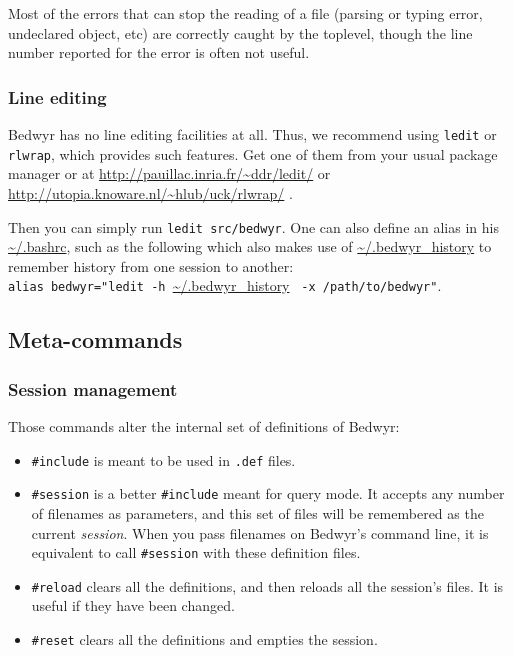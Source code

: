 \documentclass{article}
\begin{document}
Most of the errors that can stop the reading of a file (parsing or
typing error, undeclared object, etc) are correctly caught by the
toplevel, though the line number reported for the error is often not
useful.

\subsubsection{Line editing}

Bedwyr has no line editing facilities at all. Thus, we recommend using
\texttt{ledit} or \texttt{rlwrap}, which provides such features. Get one
of them from your usual package manager or at
\urldef{\thisurl}\url{http://pauillac.inria.fr/~ddr/ledit/}\ahrefurl{\thisurl}
or \urldef{\thisurl}\url{http://utopia.knoware.nl/~hlub/uck/rlwrap/}
\ahrefurl{\thisurl}.


Then you can simply run \verb.ledit src/bedwyr.. One can also define
an alias in his \url{~/.bashrc}, such as the following which also
makes use of \url{~/.bedwyr_history} to remember history from one session to
another:\\
\verb|alias bedwyr="ledit -h |\url{~/.bedwyr_history}%
\verb| -x /path/to/bedwyr"|.

\subsection{Meta-commands}

\subsubsection{Session management}

Those commands alter the internal set of definitions of Bedwyr:
\begin{itemize}
  \item
    \verb.#include. is meant to be used in \verb;.def; files.
  \item
    \verb.#session. is a better \verb.#include. meant for query mode.
    It accepts any number of filenames as parameters, and this set of files
    will be remembered as the current \emph{session}.
    When you pass filenames on Bedwyr's command line,
    it is equivalent to call \verb.#session. with these definition files.
  \item
    \verb.#reload. clears all the definitions,
    and then reloads all the session's files. It is useful if they have
    been changed.
  \item
    \verb.#reset. clears all the definitions and empties the session.
\end{itemize}
\end{document}
